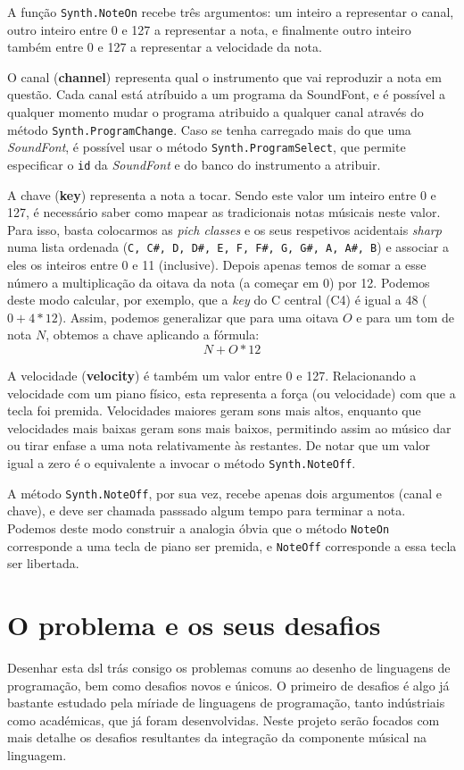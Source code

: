 \documentclass[
  oneside,
  11pt, a4paper,
  footinclude=true,
  headinclude=true,
  cleardoublepage=empty
]{scrbook}
\begin{document}
A função \texttt{Synth.NoteOn} recebe três argumentos: um inteiro a representar o canal, outro inteiro entre 0 e 127 a representar a nota, e finalmente outro inteiro também entre 0 e 127 a representar a velocidade da nota.

O canal (\textbf{channel}) representa qual o instrumento que vai reproduzir a nota em questão. Cada canal está atríbuido a um programa da SoundFont, e é possível a qualquer momento mudar o programa atribuido a qualquer canal através do método \texttt{Synth.ProgramChange}. Caso se tenha carregado mais do que uma \textit{SoundFont}, é possível usar o método \texttt{Synth.ProgramSelect}, que permite especificar o \texttt{id} da \textit{SoundFont} e do banco do instrumento a atribuir.

A chave (\textbf{key}) representa a nota a tocar. Sendo este valor um inteiro entre 0 e 127, é necessário saber como mapear as tradicionais notas músicais neste valor. Para isso, basta colocarmos as \textit{pich classes} e os seus respetivos acidentais \textit{sharp} numa lista ordenada (\verb|C, C#, D, D#, E, F, F#, G, G#, A, A#, B|) e associar a eles os inteiros entre 0 e 11 (inclusive). Depois apenas temos de somar a esse número a multiplicação da oitava da nota (a começar em 0) por 12. Podemos deste modo calcular, por exemplo, que a \textit{key} do C central (C4) é igual a 48 ($0 + 4 * 12$). Assim, podemos generalizar que para uma oitava $O$ e para um tom de nota $N$, obtemos a chave aplicando a fórmula:
$$N + O * 12$$

A velocidade (\textbf{velocity}) é também um valor entre 0 e 127. Relacionando a velocidade com um piano físico, esta representa a força (ou velocidade) com que a tecla foi premida. Velocidades maiores geram sons mais altos, enquanto que velocidades mais baixas geram sons mais baixos, permitindo assim ao músico dar ou tirar enfase a uma nota relativamente às restantes. De notar que um valor igual a zero é o equivalente a invocar o método \texttt{Synth.NoteOff}.

A método \texttt{Synth.NoteOff}, por sua vez, recebe apenas dois argumentos (canal e chave), e deve ser chamada passsado algum tempo para terminar a nota. Podemos deste modo construir a analogia óbvia que o método \texttt{NoteOn} corresponde a uma tecla de piano ser premida, e \texttt{NoteOff} corresponde a essa tecla ser libertada.


	\chapter{O problema e os seus desafios}
    Desenhar esta \acrfull{dsl} trás consigo os problemas comuns ao desenho de linguagens de programação, bem como desafios novos e únicos. O primeiro de desafios é algo já bastante estudado pela míriade de linguagens de programação, tanto indústriais como académicas, que já foram desenvolvidas. Neste projeto serão focados com mais detalhe os desafios resultantes da integração da componente músical na linguagem.
    
\end{document}
